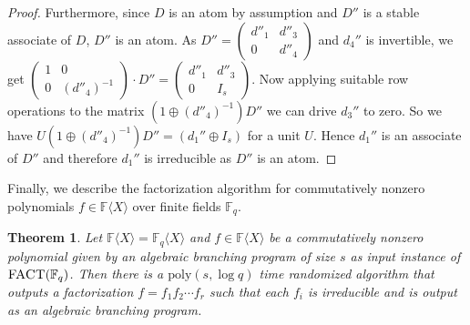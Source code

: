 \documentclass[10pt,a4paper]{article}
\newtheorem{theorem}{Theorem}[section]
\newcommand{\F}{\mathbb{F}}
\renewcommand{\angle}[1]{\langle #1 \rangle}
\newcommand{\FX}{\F\angle{X}}
\newcommand{\poly}{\mathrm{poly}}
\newcommand{\fR}{\FX}
\newcommand{\prob}[1]{\textsc{#1}}
\begin{document}
\begin{proof}
Furthermore, since $D$ is an atom by assumption and $D''$ is a stable
associate of $D$, $D''$ is an atom. As $D'' = \left(
\begin{array}{cc}
d''_1 & d''_3\\
0 & d''_4
\end{array}
\right)$ and $d_4''$ is invertible, we get $\left(
\begin{array}{cc}
1 & 0\\
0 & (d''_4)^{-1}
\end{array}
\right) \cdot D'' = \left(
\begin{array}{cc}
d''_1 & d''_3\\
0 & I_{s}
\end{array}
\right)$. Now applying suitable row operations to the matrix $(1 \oplus (d''_4)^{-1})D''$ we can drive $d_3''$ to zero. So we have $U(1 \oplus (d''_4)^{-1})D''=(d_1'' \oplus I_s)$ for a unit $U$. Hence $d_1''$ is an associate of $D''$ and therefore $d_1''$ is irreducible as $D''$ is an atom. 
  

%
%
%
%
%
%
%
%
%
%
%
%
%
%
%
%
%
%
%
%
%
%
%
%
%
%
%
%
%
%
%
%
%
%

%
%
%
\end{proof}

Finally, we describe the factorization algorithm for commutatively
nonzero polynomials $f\in\fR$ over finite fields $\F_q$.

\begin{theorem}\label{cnzthm}  
  Let $\fR=\F_q\angle{X}$ and $f\in \fR$ be a commutatively nonzero
  polynomial given by an algebraic branching program of size $s$ as
  input instance of $\prob{FACT}(\F_q)$. Then there is a
  $\poly(s, \log q)$ time randomized algorithm that outputs a
  factorization $f=f_1f_2\cdots f_r$ such that each $f_i$ is
  irreducible and is output as an algebraic branching program.
\end{theorem} 
\end{document}
